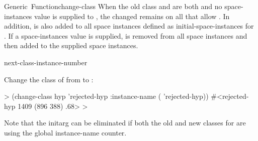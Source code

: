\documentclass[10pt,twoside,english,pdftex]{article}
\begin{document}
\begin{functiondoc}{Generic~Function}{change-class}
When the old class and  are both  and no
space-instances value is supplied to , the changed
 remains on all  that allow
 .  In addition,  is
also added to all space instances defined as initial-space-instances for
.  If a space-instances value is supplied,  is
removed from all space instances and then added to the supplied space
instances.

\begin{alsos}{next-class-instance-number}
\end{alsos}

\fnexample
{}%
%
Change the class of   from
 to :
%
\W\supp
\begin{example}
  > (change-class hyp 'rejected-hyp 
      :instance-name ( 'rejected-hyp))
  #<rejected-hyp 1409 (896 388) .68>
  >
\end{example} 
%
Note that the  initarg can be eliminated if both
the old and new classes for  are using the global instance-name
counter.

\end{functiondoc}

\end{document}
